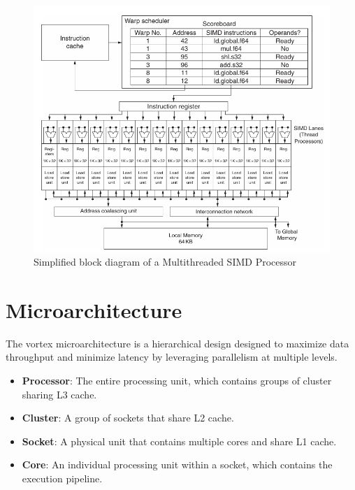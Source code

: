 \documentclass[12pt]{report}
\begin{document}
\begin{figure}[H]
    \centering
    \includegraphics[width=1\textwidth]{./figures/simt.png}
    \caption{Simplified block diagram of a Multithreaded SIMD Processor}
\end{figure}

\section{Microarchitecture}

The vortex microarchitecture is a hierarchical design designed to maximize data throughput and minimize latency by leveraging parallelism at multiple levels.

\begin{itemize}
    \item \textbf{Processor}: The entire processing unit, which contains groups of cluster sharing L3 cache.
    \item \textbf{Cluster}: A group of sockets that share L2 cache.
    \item \textbf{Socket}: A physical unit that contains multiple cores and share L1 cache.
    \item \textbf{Core}: An individual processing unit within a socket, which contains the execution pipeline.
\end{itemize}
\end{document}

